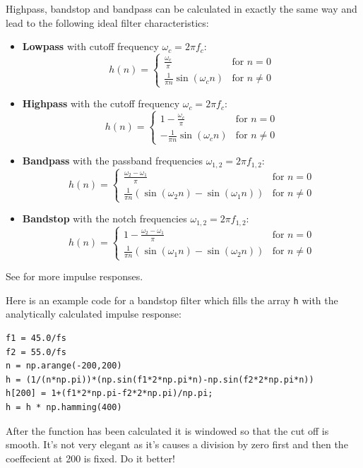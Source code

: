 \documentclass[12pt,a4paper]{article}
\begin{document}
Highpass, bandstop and bandpass can be calculated in exactly the same
way and lead to the following ideal filter characteristics:
\begin{itemize}
\item \textbf{Lowpass} with cutoff frequency $\omega_c=2\pi f_c$:
\begin{equation}
h(n) = 
\left\{
\begin{array}{ll}
\frac{\omega_c}{\pi} & \mbox{for $n=0$} \\
\frac{1}{\pi n} \sin(\omega_c n) & \mbox{for $n\neq 0$}
\end{array}
\right.
\label{idealLP}
\end{equation}

\item \textbf{Highpass} with the cutoff frequency $\omega_c=2\pi f_c$:
\begin{equation}
h(n)=
\left\{ 
\begin{array}{ll}
1-\frac{\omega_c}{\pi} & \mbox{for $n=0$} \\
-\frac{1}{\pi n} \sin(\omega_c n) & \mbox{for $n\neq 0$}
\end{array}
\right.
\end{equation}

\item \textbf{Bandpass} with the passband frequencies $\omega_{1,2}=2\pi f_{1,2}$:
\begin{equation}
h(n)=
\left\{ 
\begin{array}{ll}
\frac{\omega_2-\omega_1}{\pi} & \mbox{for $n=0$} \\
\frac{1}{\pi n}(\sin(\omega_2 n)-\sin(\omega_1 n)) & \mbox{for $n\neq 0$}
\end{array}
\right.
\end{equation}

\item \textbf{Bandstop} with the notch frequencies $\omega_{1,2}=2\pi f_{1,2}$:
\begin{equation}
h(n)=
\left\{ 
\begin{array}{ll}
1-\frac{\omega_2-\omega_1}{\pi} & \mbox{for $n=0$} \\
\frac{1}{\pi n}(\sin(\omega_1 n)-\sin(\omega_2 n)) & \mbox{for $n\neq 0$}
\end{array}
\right.
\end{equation}
\end{itemize}
See \citet[p.195]{Diniz2002} for more impulse responses.

Here is an example code for a bandstop filter which fills the array
\texttt{h} with the analytically calculated impulse response:
\begin{verbatim}
f1 = 45.0/fs
f2 = 55.0/fs
n = np.arange(-200,200)
h = (1/(n*np.pi))*(np.sin(f1*2*np.pi*n)-np.sin(f2*2*np.pi*n))
h[200] = 1+(f1*2*np.pi-f2*2*np.pi)/np.pi;
h = h * np.hamming(400)
\end{verbatim}
After the function has been calculated it is windowed so that the
cut off is smooth. It's not very elegant as it's causes a division by zero first and
then the coeffecient at 200 is fixed. Do it better!
\end{document}
